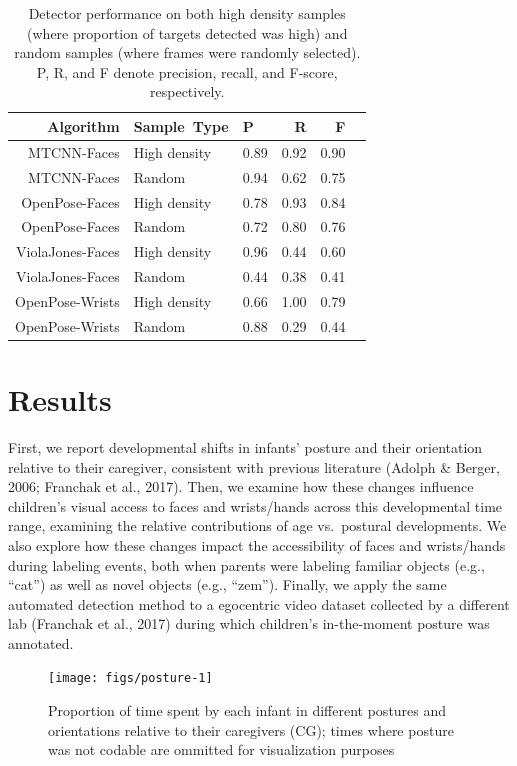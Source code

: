 \documentclass[english,man]{apa6}
\begin{document}
\begin{table}[ht]
\centering
\begin{tabular}{rllrrr}
\hline
Algorithm & Sample\ Type & P & R & F \\ 
\hline
MTCNN-Faces & High density & 0.89 & 0.92 & 0.90 \\ 
MTCNN-Faces & Random & 0.94 & 0.62 & 0.75 \\ 
OpenPose-Faces & High density & 0.78 & 0.93 & 0.84 \\ 
OpenPose-Faces & Random & 0.72 & 0.80 & 0.76 \\ 
ViolaJones-Faces & High density & 0.96 & 0.44 & 0.60 \\ 
ViolaJones-Faces & Random & 0.44 & 0.38 & 0.41 \\ 
OpenPose-Wrists & High density & 0.66 & 1.00 & 0.79 \\ 
OpenPose-Wrists & Random & 0.88 & 0.29 & 0.44 \\ 
\hline
\end{tabular}
\caption{Detector performance on both high density samples (where proportion of targets detected was high) and random samples (where frames were randomly selected). P, R, and F denote precision, recall, and F-score, respectively.} 
\vspace{-1em}
\end{table}

\section{Results}\label{results}

First, we report developmental shifts in infants' posture and their
orientation relative to their caregiver, consistent with previous
literature (Adolph \& Berger, 2006; Franchak et al., 2017). Then, we
examine how these changes influence children's visual access to faces
and wrists/hands across this developmental time range, examining the
relative contributions of age vs.~postural developments. We also explore
how these changes impact the accessibility of faces and wrists/hands
during labeling events, both when parents were labeling familiar objects
(e.g., \enquote{cat}) as well as novel objects (e.g., \enquote{zem}).
Finally, we apply the same automated detection method to a egocentric
video dataset collected by a different lab (Franchak et al., 2017)
during which children's in-the-moment posture was annotated.

\begin{figure}[H]
\texttt{[image: figs/posture-1]} \caption{Proportion of time spent by each infant in different postures and orientations relative to their caregivers (CG); times where posture was not codable are ommitted for visualization purposes}\label{fig:posture}
\end{figure}
\end{document}
